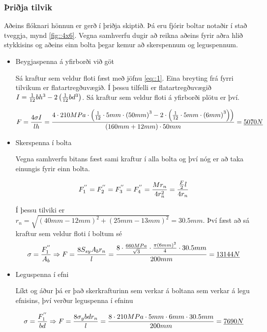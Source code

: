 \subsubsection{Þriðja tilvik}

Aðeins flóknari hönnun er gerð í þriðja skiptið. 
Þá eru fjórir boltar notaðir í stað tveggja, \sbr mynd \ref{fig::4x6}. 
Vegna samhverfu dugir að reikna aðeins fyrir aðra hlið stykkisins og aðeins einn bolta þegar kemur að skerspennum og leguspennum.

\begin{itemize}
\item Beygjaspenna á yfirborði við göt
  
  Sá kraftur sem veldur floti fæst með jöfnu \ref{eq::1}. 
  Eina breyting frá fyrri tilvikum er flatartregðuvægið. 
  Í þessu tilfelli er flatartregðuvægið $I = {1 \over 12}bh^3 - 2\left({1 \over 12}bd^3\right)$. 
  Sá kraftur sem veldur floti á yfirborði plötu er því.
  
  \[
  F = \frac{4 \sigma I}{l h} 
  = 
  {
    4 \cdot 210 MPa \cdot 
    \left(
      {1 \over 12} \cdot 5 mm \cdot 
      \left(
        50mm
      \right)^3 
      - 2 \cdot 
      \left(
        {1 \over 12} \cdot 5 mm \cdot 
        \left(
          6mm
        \right)^3
      \right)
    \right) 
    \over 
    (160 mm + 12 mm) \cdot 50 mm
  } 
  = \underline{5070N}
  \] 
  
\item Skerspenna í bolta
  
  Vegna samhverfu bitans fæst sami kraftur í alla bolta og því nóg er að taka einungis fyrir einn bolta.
  
  \[
  F_1^{''} 
  = F_2^{''} 
  = F_3^{''} 
  = F_4^{''} 
  = {Mr_n \over 4r_n^2} 
  = {{F \over 2}l \over 4 r_n} 
  \]
  
  Í þessu tilviki er $r_n = \sqrt{(40mm - 12mm)^2 + (25mm - 13mm)^2} = 30.5 mm$. 
  Því fæst að sá kraftur sem veldur floti í boltum sé 
  \[
  \sigma = {F_1^{''} \over A_b} 
  \Rightarrow F 
  = {8 S_{sy} A_b r_n \over l} 
  = {8 \cdot {660MPa \over \sqrt{3}} \cdot 
    {
      \pi 
      \left(
        6mm
      \right)^2 
      \over 
      4
    } 
    \cdot 30.5 mm \over 200 mm
  } 
  = \underline{13144N}
  \]
  
  
\item Leguspenna í efni
  
  Líkt og áður þá er það skerkrafturinn sem verkar á boltana sem verkar á legu efnisins, því verður leguspenna í efninu
  
  \[
  \sigma = {F_1^{''} \over bd} 
  \Rightarrow F
  = {8 \sigma_{y} b d r_n \over l} 
  = {
    8 \cdot 210 MPa \cdot 5 mm \cdot 6 mm \cdot 30.5 mm 
    \over 
    200mm
  } 
  = \underline{7690N}
  \]

\end{itemize}

